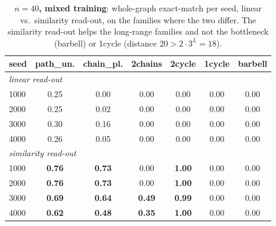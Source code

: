 \documentclass[11pt,a4paper]{article}
\begin{document}
\begin{table}[H]\centering\small
\begin{tabular}{lcccccc}
\toprule
seed & path\_un. & chain\_pl. & 2chains & 2cycle & 1cycle & barbell \\
\midrule
\multicolumn{7}{l}{\emph{linear read-out}}\\
1000 & 0.25 & 0.00 & 0.00 & 0.00 & 0.00 & 0.00 \\
2000 & 0.25 & 0.02 & 0.00 & 0.00 & 0.00 & 0.00 \\
3000 & 0.30 & 0.16 & 0.00 & 0.00 & 0.00 & 0.00 \\
4000 & 0.26 & 0.05 & 0.00 & 0.00 & 0.00 & 0.00 \\
\midrule
\multicolumn{7}{l}{\emph{similarity read-out}}\\
1000 & \textbf{0.76} & \textbf{0.73} & 0.00 & \textbf{1.00} & 0.00 & 0.00 \\
2000 & \textbf{0.76} & \textbf{0.73} & 0.00 & \textbf{1.00} & 0.00 & 0.00 \\
3000 & \textbf{0.69} & \textbf{0.64} & \textbf{0.49} & \textbf{0.99} & 0.00 & 0.00 \\
4000 & \textbf{0.62} & \textbf{0.48} & \textbf{0.35} & \textbf{1.00} & 0.00 & 0.00 \\
\bottomrule\end{tabular}
\caption{\textbf{$n=40$, mixed training}: whole-graph exact-match per seed, linear vs.\
similarity read-out, on the families where the two differ. The similarity read-out helps the
long-range families and not the bottleneck (barbell) or 1cycle (distance $20>2\cdot3^L=18$).}
\label{tab:simlin_n40}
\end{table}
\end{document}
